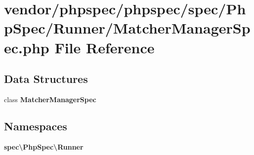 \section{vendor/phpspec/phpspec/spec/\+Php\+Spec/\+Runner/\+Matcher\+Manager\+Spec.php File Reference}
\label{_matcher_manager_spec_8php}
\subsection*{Data Structures}
\begin{DoxyCompactItemize}
\item 
class {\bf Matcher\+Manager\+Spec}
\end{DoxyCompactItemize}
\subsection*{Namespaces}
\begin{DoxyCompactItemize}
\item 
 {\bf spec\textbackslash{}\+Php\+Spec\textbackslash{}\+Runner}
\end{DoxyCompactItemize}
